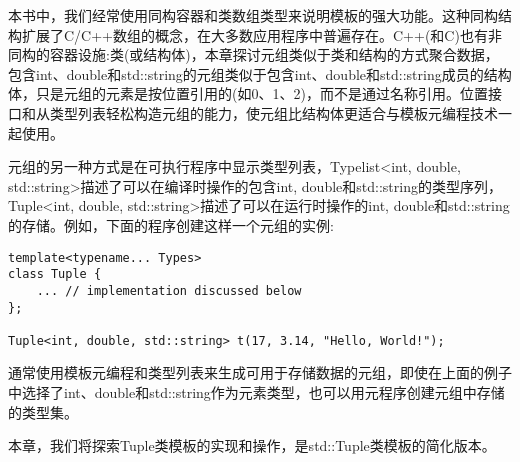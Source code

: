 本书中，我们经常使用同构容器和类数组类型来说明模板的强大功能。这种同构结构扩展了C/C++数组的概念，在大多数应用程序中普遍存在。C++(和C)也有非同构的容器设施:类(或结构体)，本章探讨元组类似于类和结构的方式聚合数据，包含int、double和std::string的元组类似于包含int、double和std::string成员的结构体，只是元组的元素是按位置引用的(如0、1、2)，而不是通过名称引用。位置接口和从类型列表轻松构造元组的能力，使元组比结构体更适合与模板元编程技术一起使用。

元组的另一种方式是在可执行程序中显示类型列表，Typelist<int, double, std::string>描述了可以在编译时操作的包含int, double和std::string的类型序列，Tuple<int, double, std::string>描述了可以在运行时操作的int, double和std::string的存储。例如，下面的程序创建这样一个元组的实例:

\begin{lstlisting}[style=styleCXX]
template<typename... Types>
class Tuple {
	... // implementation discussed below
};

Tuple<int, double, std::string> t(17, 3.14, "Hello, World!");
\end{lstlisting}

通常使用模板元编程和类型列表来生成可用于存储数据的元组，即使在上面的例子中选择了int、double和std::string作为元素类型，也可以用元程序创建元组中存储的类型集。

本章，我们将探索Tuple类模板的实现和操作，是std::Tuple类模板的简化版本。






























